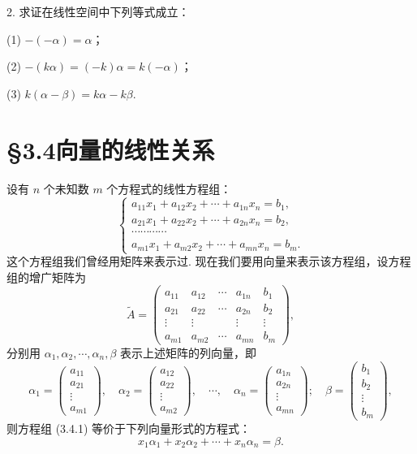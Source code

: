 \documentclass[UTF8,12pt,a4paper,fontset=fandol]{ctexart}
\begin{document}
2. 求证在线性空间中下列等式成立：

(1) $-(-\alpha)=\alpha$；

(2) $-(k\alpha)=(-k)\alpha=k(-\alpha)$；

(3) $k(\alpha-\beta)=k\alpha-k\beta$.

\section*{§3.4\quad 向量的线性关系}

设有 $n$ 个未知数 $m$ 个方程式的线性方程组：
\begin{equation}
\left\{
\begin{array}{l}
a_{11}x_1+a_{12}x_2+\cdots+a_{1n}x_n=b_1,\\
a_{21}x_1+a_{22}x_2+\cdots+a_{2n}x_n=b_2,\\
\cdots\cdots\cdots\cdots\\
a_{m1}x_1+a_{m2}x_2+\cdots+a_{mn}x_n=b_m.
\end{array}
\right.
\tag{3.4.1}
\end{equation}
这个方程组我们曾经用矩阵来表示过. 现在我们要用向量来表示该方程组，设方程组的增广矩阵为
\[
\widetilde{A}=
\left(\begin{array}{ccccc}
a_{11}&a_{12}&\cdots&a_{1n}&b_1\\
a_{21}&a_{22}&\cdots&a_{2n}&b_2\\
\vdots&\vdots&&\vdots&\vdots\\
a_{m1}&a_{m2}&\cdots&a_{mn}&b_m
\end{array}\right),
\]
分别用 $\alpha_1,\alpha_2,\cdots,\alpha_n,\beta$ 表示上述矩阵的列向量，即
\[
\alpha_1=\left(\begin{array}{c}
a_{11}\\
a_{21}\\
\vdots\\
a_{m1}
\end{array}\right),\quad
\alpha_2=\left(\begin{array}{c}
a_{12}\\
a_{22}\\
\vdots\\
a_{m2}
\end{array}\right),\quad \cdots,\quad
\alpha_n=\left(\begin{array}{c}
a_{1n}\\
a_{2n}\\
\vdots\\
a_{mn}
\end{array}\right);\quad
\beta=\left(\begin{array}{c}
b_1\\
b_2\\
\vdots\\
b_m
\end{array}\right),
\]
则方程组 (3.4.1) 等价于下列向量形式的方程式：
\begin{equation}
x_1\alpha_1+x_2\alpha_2+\cdots+x_n\alpha_n=\beta.
\tag{3.4.2}
\end{equation}
\end{document}
